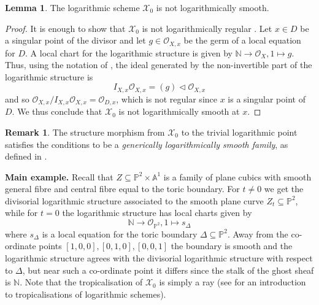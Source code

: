 \documentclass[11pt]{amsart}
\newcommand{\runningexample}{\noindent \textbf{Main example.} }
\theoremstyle{definition}
\theoremstyle{definition}
\newtheorem{lemma}[theorem]{Lemma}
\newtheorem{remark}[theorem]{Remark}
\newcommand{\Aaff}{\mathbb{A}}
\newcommand{\PP}{\mathbb{P}}
\newcommand{\OO}{\mathcal{O}}
\newcommand{\N}{\mathbb{N}}
\newcommand{\Xcal}{\mathcal{X}}
\begin{document}
\begin{lemma}\label{lem: X0 not logarithmically smooth} The logarithmic scheme $\Xcal_0$ is not logarithmically smooth.\end{lemma}
\begin{proof} It is enough to show that $\Xcal_0$ is not logarithmically regular \cite[Theorem~3.5.1]{OgusBook}. Let $x \in D$ be a singular point of the divisor and let $g \in \OO_{X,x}$ be the germ of a local equation for $D$. A local chart for the logarithmic structure is given by $\N \to \OO_X, 1 \mapsto g$. Thus, using the notation of \cite[Definition 2.2]{Niziol}, the ideal generated by the non-invertible part of the logarithmic structure is
\begin{equation*} I_{X,x}\OO_{X,x} = (g) \vartriangleleft \OO_{X,x} \end{equation*}
and so $\OO_{X,x}/I_{X,x}\OO_{X,x} = \OO_{D,x}$, which is not regular since $x$ is a singular point of $D$. We thus conclude that $\Xcal_0$ is not logarithmically smooth at $x$.	
\end{proof}

\begin{remark} The structure morphism from $\Xcal_0$ to the trivial logarithmic point satisfies the conditions to be a \emph{generically logarithmically smooth family}, as defined in \cite[Definition 2.1]{FFRSmoothingToroidal}.
\end{remark}

\runningexample Recall that $Z \subseteq \PP^2 \times \Aaff^{\! 1}$ is a family of plane cubics with smooth general fibre and central fibre equal to the toric boundary. For $t \neq 0$ we get the divisorial logarithmic structure associated to the smooth plane curve $Z_t \subseteq \PP^2$, while for $t=0$ the logarithmic structure has local charts given by
\begin{equation*} \N \to \OO_{\PP^2}, 1 \mapsto s_\Delta \end{equation*}
where $s_\Delta$ is a local equation for the toric boundary $\Delta \subseteq \PP^2$. Away from the co-ordinate points $[1,0,0],[0,1,0],[0,0,1]$ the boundary is smooth and the logarithmic structure agrees with the divisorial logarithmic structure with respect to $\Delta$, but near such a co-ordinate point it differs since the stalk of the ghost sheaf is $\N$. Note that the tropicalisation of $\Xcal_0$ is simply a ray (see \cite[Appendix B]{GrossSiebertLog} for an introduction to tropicalisations of logarithmic schemes).\medskip
\end{document}
